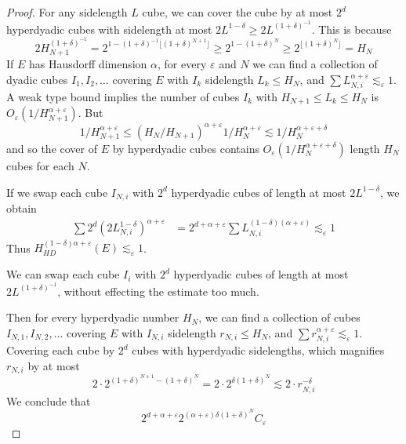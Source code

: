 \begin{proof}
    For any sidelength $L$ cube, we can cover the cube by at most $2^d$ hyperdyadic cubes with sidelength at most $2L^{1 - \delta} \geq 2L^{(1+\delta)^{-1}}$. This is because
    \[ 2 H_{N+1}^{(1 + \delta)^{-1}} = 2^{1 - (1 + \delta)^{-1} \lfloor (1 + \delta)^{N+1} \rfloor} \geq 2^{1 - (1 + \delta)^N} \geq 2^{\lfloor (1 + \delta)^N \rfloor} = H_N \]
    If $E$ has Hausdorff dimension $\alpha$, for every $\varepsilon$ and $N$ we can find a collection of dyadic cubes $I_1, I_2, \dots$ covering $E$ with $I_k$ sidelength $L_k \leq H_N$, and $\sum L_{N,i}^{\alpha + \varepsilon} \lesssim_\varepsilon 1$. A weak type bound implies the number of cubes $I_k$ with $H_{N+1} \leq L_k \leq H_N$ is $O_\varepsilon(1/H_{N+1}^{\alpha + \varepsilon})$. But
    \[ 1/H_{N+1}^{\alpha + \varepsilon} \leq (H_N/H_{N+1})^{\alpha + \varepsilon} 1/H_N^{\alpha + \varepsilon} \lesssim 1 / H_N^{\alpha + \varepsilon + \delta} \]
    and so the cover of $E$ by hyperdyadic cubes contains $O_\varepsilon(1/H_N^{\alpha + \varepsilon + \delta})$ length $H_N$ cubes for each $N$.



    If we swap each cube $I_{N,i}$ with $2^d$ hyperdyadic cubes of length at most $2L^{1 - \delta}$, we obtain
    \begin{align*}
        \sum 2^d (2 L_{N,i}^{1 - \delta})^{\alpha + \varepsilon} &= 2^{d + \alpha + \varepsilon} \sum L_{N,i}^{(1 - \delta)(\alpha + \varepsilon)} \lesssim_\varepsilon 1
    \end{align*}
    Thus $H^{(1 - \delta)\alpha + \varepsilon}_{HD}(E) \lesssim_\varepsilon 1$.

    We can swap each cube $I_i$ with $2^d$ hyperdyadic cubes of length at most $2L^{(1 + \delta)^{-1}}$, without effecting the estimate too much.

    Then for every hyperdyadic number $H_N$, we can find a collection of cubes $I_{N,1}, I_{N,2}, \dots$ covering $E$ with $I_{N,i}$ sidelength $r_{N,i} \leq H_N$, and $\sum r_{N,i}^{\alpha + \varepsilon} \lesssim_\varepsilon 1$. Covering each cube by $2^d$ cubes with hyperdyadic sidelengths, which magnifies $r_{N,i}$ by at most
    \[ 2 \cdot 2^{(1 + \delta)^{N+1} - (1 + \delta)^N} = 2 \cdot 2^{\delta (1 + \delta)^N} \lesssim 2 \cdot r_{N,i}^{- \delta} \]
    We conclude that
    \[ 2^{d+\alpha+\varepsilon} 2^{(\alpha + \varepsilon) \delta(1 + \delta)^N} C_\varepsilon \]
\end{proof}


